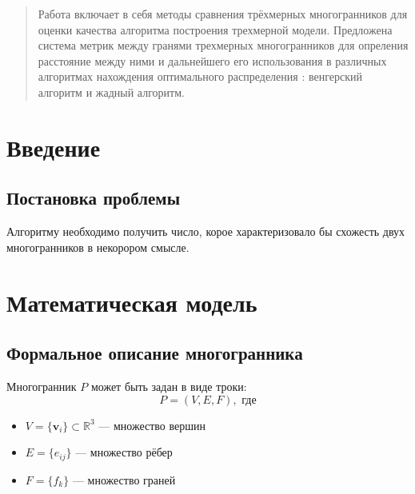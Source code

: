 \documentclass[a4paper,14pt]{extarticle}
\begin{document}
\maketitle

\begin{abstract}
Работа включает в себя методы сравнения трёхмерных многогранников для оценки качества алгоритма построения трехмерной модели.
Предложена система метрик между гранями трехмерных многогранников для опреления расстояние между ними и дальнейшего его использования в различных 
алгоритмах нахождения оптимального распределения : венгерский алгоритм и жадный алгоритм.
\end{abstract}

\section{Введение}

\subsection{Постановка проблемы}
Алгоритму необходимо получить число, корое характеризовало бы схожесть двух многогранников в некорором смысле.

\section{Математическая модель}
\subsection{Формальное описание многогранника}
Многогранник $P$ может быть задан в виде троки:
\begin{equation}
P = (V, E, F), \text{ где}
\end{equation}
\begin{itemize}
    \item $V = \{\mathbf{v}_i\} \subset \mathbb{R}^3$ — множество вершин
    \item $E = \{e_{ij}\}$ — множество рёбер
    \item $F = \{f_k\}$ — множество граней
\end{itemize}
\end{document}
